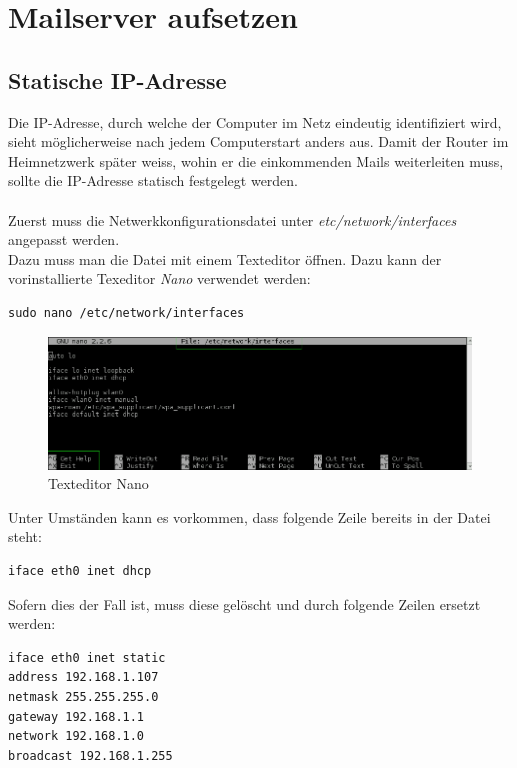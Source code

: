 \section{Mailserver aufsetzen}

\subsection{Statische IP-Adresse}
Die IP-Adresse, durch welche der Computer im Netz eindeutig identifiziert wird, sieht möglicherweise nach jedem Computerstart anders aus. Damit der Router im Heimnetzwerk später weiss, wohin er die einkommenden Mails weiterleiten muss, sollte die IP-Adresse statisch festgelegt werden.
\\
\\
Zuerst muss die Netwerkkonfigurationsdatei unter \textit{etc/network/interfaces} angepasst werden.
\\
Dazu muss man die Datei mit einem Texteditor öffnen. Dazu kann der vorinstallierte Texeditor \textit{Nano} verwendet werden:

\begin{lstlisting}
sudo nano /etc/network/interfaces
\end{lstlisting}

\begin{figure}[h]
\centering
\includegraphics[scale=0.6]{images/nano}
\caption{Texteditor Nano}
\end{figure}

Unter Umständen kann es vorkommen, dass folgende Zeile bereits in der Datei steht:

\begin{lstlisting}
iface eth0 inet dhcp
\end{lstlisting}

Sofern dies der Fall ist, muss diese gelöscht und durch folgende Zeilen ersetzt werden:

\begin{lstlisting}
iface eth0 inet static
address 192.168.1.107
netmask 255.255.255.0
gateway 192.168.1.1
network 192.168.1.0
broadcast 192.168.1.255
\end{lstlisting}

